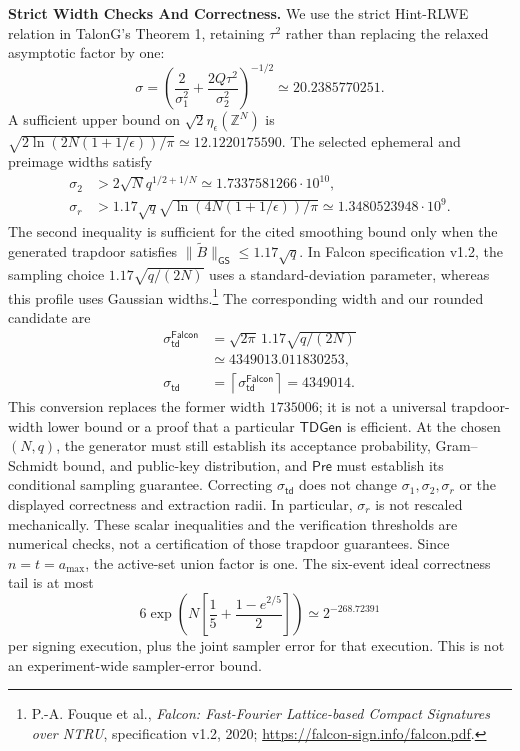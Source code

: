 \documentclass[lettersize,journal]{IEEEtran}
\newcommand{\parab}[1]{\noindent\textbf{#1} }
\begin{document}
	\parab{Strict Width Checks And Correctness.}
	We use the strict Hint-RLWE relation in TalonG's Theorem 1, retaining
	$\tau^2$ rather than replacing the relaxed asymptotic factor by one:
	\[
	\sigma=\left(\frac{2}{\sigma_1^2}
	+\frac{2Q\tau^2}{\sigma_2^2}\right)^{-1/2}
	\simeq20.2385770251.
	\]
	A sufficient upper bound on $\sqrt2\eta_\epsilon(\mathbb Z^N)$ is
	$\sqrt{2\ln(2N(1+1/\epsilon))/\pi}\simeq12.1220175590$.
	The selected ephemeral and preimage widths satisfy
	\[
	\begin{aligned}
		\sigma_2&>2\sqrt N q^{1/2+1/N}
		\simeq1.7337581266\cdot10^{10},\\
		\sigma_r&>1.17\sqrt q\sqrt{\ln(4N(1+1/\epsilon))/\pi}
		\simeq1.3480523948\cdot10^9.
	\end{aligned}
	\]
	The second inequality is sufficient for the cited smoothing
	bound only when the generated trapdoor satisfies
	$\|\widetilde B\|_{\mathsf{GS}}\leq1.17\sqrt q$.
	In Falcon specification v1.2, the sampling choice $1.17\sqrt{q/(2N)}$
	uses a standard-deviation parameter, whereas this profile uses Gaussian widths.\footnote{P.-A. Fouque et al.,
		\emph{Falcon: Fast-Fourier Lattice-based Compact Signatures over NTRU},
		specification v1.2, 2020;
		\url{https://falcon-sign.info/falcon.pdf}.}
	The corresponding width and our rounded candidate are
	\[
	\begin{aligned}
		\sigma_{\mathsf{td}}^{\mathsf{Falcon}}
		&=\sqrt{2\pi}\,1.17\sqrt{q/(2N)}\\
		&\simeq4349013.011830253,\\
		\sigma_{\mathsf{td}}
		&=\left\lceil\sigma_{\mathsf{td}}^{\mathsf{Falcon}}\right\rceil
		=4349014.
	\end{aligned}
	\]
	This conversion replaces the former width $1735006$; it is not a
	universal trapdoor-width lower bound or a proof that a particular
	$\mathsf{TDGen}$ is efficient. At the chosen $(N,q)$, the generator must
	still establish its acceptance probability, Gram--Schmidt bound, and
	public-key distribution, and $\mathsf{Pre}$ must establish its conditional
	sampling guarantee. Correcting $\sigma_{\mathsf{td}}$ does not change
	$\sigma_1,\sigma_2,\sigma_r$ or the displayed correctness and extraction
	radii. In particular, $\sigma_r$ is not rescaled mechanically.
	These scalar inequalities and the verification thresholds are numerical
	checks, not a certification of those trapdoor guarantees.
	Since $n=t=a_{\max}$, the active-set union factor is one.
	The six-event ideal correctness tail is at most
	\[
	6\exp\!\left(N\left[\frac15+
	\frac{1-e^{2/5}}2\right]\right)
	\simeq2^{-268.72391}
	\]
	per signing execution, plus the joint sampler error for that execution.
	This is not an experiment-wide sampler-error bound.
	
\end{document}
